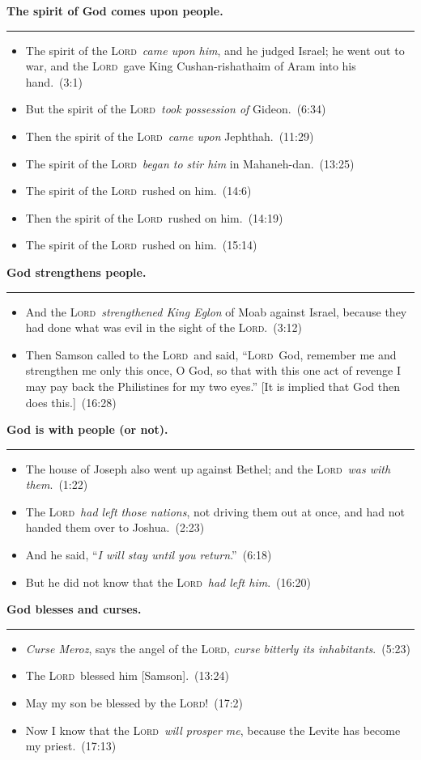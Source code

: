 \documentclass{article}
\newcommand{\godcategory}[1]{\bigskip\noindent \textbf{#1}\smallskip\hrule\nopagebreak}
\newcommand{\Lord}{\textsc{Lord}}
\begin{document}
\begin{landscape}
\begin{multicols}{3}
\godcategory{The spirit of God comes upon people.}
\begin{itemize}
  \item The spirit of the \Lord\ \emph{came upon him}, and he judged Israel; he went out to war, and the \Lord\ gave King Cushan-rishathaim of Aram into his hand.~(3:1)
  \item But the spirit of the \Lord\ \emph{took possession of} Gideon.~(6:34)
  \item Then the spirit of the \Lord\ \emph{came upon} Jephthah.~(11:29)
  \item The spirit of the \Lord\ \emph{began to stir him} in \hbox{Mahaneh-dan.}~(13:25)
  \item The spirit of the \Lord\ rushed on him.~(14:6)
  \item Then the spirit of the \Lord\ rushed on him.~(14:19)
  \item The spirit of the \Lord\ rushed on him.~(15:14)
\end{itemize}

\clearpage

\godcategory{God strengthens people.}
\begin{itemize}
  \item And the \Lord\ \emph{strengthened King Eglon} of Moab against Israel, because they had done what was evil in the sight of the \Lord.~(3:12)
  \item Then Samson called to the \Lord\ and said, “\Lord\ God, remember me and strengthen me only this once, O God, so that with this one act of revenge I may pay back the Philistines for my two eyes.” [It is implied that God then does this.]~(16:28)
\end{itemize}

\godcategory{God is with people (or not).}
\begin{itemize}
  \item The house of Joseph also went up against Bethel; and the \Lord\ \emph{was with them}.~(1:22)
  \item The \Lord\ \emph{had left those nations}, not driving them out at once, and had not handed them over to Joshua.~(2:23)
  \item And he said, “\emph{I will stay until you return}.”~(6:18)
  \item But he did not know that the \Lord\ \emph{had left him}.~(16:20)
\end{itemize}

\godcategory{God blesses and curses.}
\begin{itemize}
  \item \emph{Curse Meroz}, says the angel of the \Lord, \emph{curse bitterly its inhabitants}.~(5:23)
  \item The \Lord\ blessed him [Samson].~(13:24)
  \item May my son be blessed by the \Lord!~(17:2)
  \item Now I know that the \Lord\ \emph{will prosper me}, because the Levite has become my priest.~(17:13)
\end{itemize}


\end{multicols}
\end{landscape}
\end{document}
